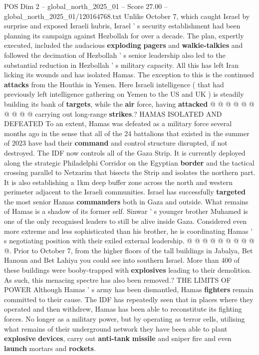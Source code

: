 \begin{textsample}{POS Dim 2 – global\_north\_2025\_01 – Score 27.00 – global\_north\_2025\_01/120164768.txt}
Unlike October 7, which caught Israel by surprise and exposed Israeli hubris, Israel ' s security establishment had been planning its campaign against Hezbollah for over a decade.
The plan, expertly executed, included the audacious \textbf{exploding} \textbf{pagers} and \textbf{walkie-talkies} and followed the decimation of Hezbollah ' s senior leadership also led to the substantial reduction in Hezbollah ' s military capacity.
All this has left Iran licking its wounds and has isolated Hamas.
The exception to this is the continued \textbf{attacks} from the Houthis in Yemen.
Here Israeli intelligence ( that had previously left intelligence gathering on Yemen to the US and UK ) is steadily building its bank of \textbf{targets}, while the \textbf{air} force, having \textbf{attacked} @ @ @ @ @ @ @ @ @ @ carrying out long-range \textbf{strikes}.?
HAMAS ISOLATED AND DEFEATED To an extent, Hamas was defeated as a military force several months ago in the sense that all of the 24 battalions that existed in the summer of 2023 have had their \textbf{command} and control structure disrupted, if not destroyed.
The IDF now controls all of the Gaza Strip.
It is currently deployed along the strategic Philadelphi Corridor on the Egyptian \textbf{border} and the tactical crossing parallel to Netzarim that bisects the Strip and isolates the northern part.
It is also establishing a 1km deep buffer zone across the north and western perimeter adjacent to the Israeli communities.
Israel has successfully \textbf{targeted} the most senior Hamas \textbf{commanders} both in Gaza and outside.
What remains of Hamas is a shadow of its former self.
Sinwar ' s younger brother Muhamed is one of the only recognised leaders to still be alive inside Gaza.
Considered even more extreme and less sophisticated than his brother, he is coordinating Hamas ' s negotiating position with their exiled external leadership. @ @ @ @ @ @ @ @ @ @.
Prior to October 7, from the higher floors of the tall buildings in Jabalya, Bet Hanoun and Bet Lahiya you could see into southern Israel.
More than 400 of these buildings were booby-trapped with \textbf{explosives} leading to their demolition.
As such, this menacing spectre has also been removed.?
THE LIMITS OF POWER Although Hamas ' s army has been dismantled, Hamas \textbf{fighters} remain committed to their cause.
The IDF has repeatedly seen that in places where they operated and then withdrew, Hamas has been able to reconstitute its fighting forces.
No longer as a military power, but by operating as terror cells, utilising what remains of their underground network they have been able to plant \textbf{explosive} \textbf{devices}, carry out \textbf{anti-tank} \textbf{missile} and sniper fire and even \textbf{launch} mortars and \textbf{rockets}.

\end{textsample}
